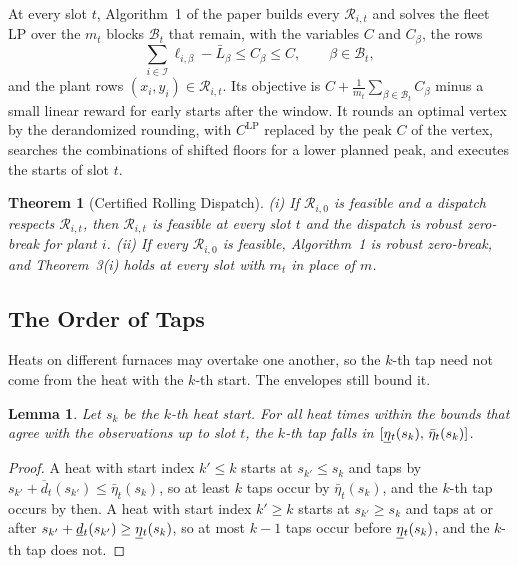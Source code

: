 \documentclass[11pt]{article}
\newtheorem{theorem}{Theorem}
\newtheorem{lemma}{Lemma}
\newcommand{\calB}{\mathcal{B}}
\newcommand{\calI}{\mathcal{I}}
\newcommand{\calR}{\mathcal{R}}
\newcommand{\CLP}{C^{\mathrm{LP}}}
\newcommand{\dmin}{\vphantom{\underline{d}}\smash[b]{\underline{d}}}
\newcommand{\dmax}{\overline{d}}
\newcommand{\etamin}{\vphantom{\underline{\eta}}\smash[b]{\underline{\eta}}}
\begin{document}
At every slot $t$, Algorithm~1 of the paper builds every $\calR_{i,t}$ and solves the fleet LP over the $m_t$ blocks
$\calB_t$ that remain, with the variables $C$ and $C_\beta$, the rows
\begin{equation}\label{eq:rollcap}
\sum_{i\in\calI}\ell_{i,\beta}-\bar L_\beta\le C_\beta\le C,\qquad\beta\in\calB_t,
\end{equation}
and the plant rows $(x_i,y_i)\in\calR_{i,t}$. Its objective is $C+\frac1{m_t}\sum_{\beta\in\calB_t}C_\beta$ minus a small linear
reward for early starts after the window. It rounds an optimal vertex by the derandomized
rounding, with $\CLP$ replaced by the peak $C$ of the vertex, searches the combinations of shifted floors for a lower
planned peak, and executes the starts of slot $t$.

\begin{theorem}[Certified Rolling Dispatch]
(i) If $\calR_{i,0}$ is feasible and a dispatch respects $\calR_{i,t}$, then $\calR_{i,t}$ is feasible at every slot
$t$ and the dispatch is robust zero-break for plant $i$. (ii) If every $\calR_{i,0}$ is feasible, Algorithm~1 is robust
zero-break, and Theorem~3(i) holds at every slot with $m_t$ in place of $m$.
\end{theorem}

\subsection{The Order of Taps}

Heats on different furnaces may overtake one another, so the $k$-th tap need not come from the heat with the $k$-th
start. The envelopes still bound it.

\begin{lemma}\label{lem:taps}
Let $s_k$ be the $k$-th heat start. For all heat times within the bounds that agree with the observations up to slot
$t$, the $k$-th tap falls in $[\etamin_t(s_k),\,\bar\eta_t(s_k)]$.
\end{lemma}

\begin{proof}
A heat with start index $k'\le k$ starts at $s_{k'}\le s_k$ and taps by $s_{k'}+\dmax_t(s_{k'})\le\bar\eta_t(s_k)$,
so at least $k$ taps occur by $\bar\eta_t(s_k)$, and the $k$-th tap occurs by then. A heat with start index $k'\ge k$
starts at $s_{k'}\ge s_k$ and taps at or after $s_{k'}+\dmin_t(s_{k'})\ge\etamin_t(s_k)$, so at most $k-1$ taps occur
before $\etamin_t(s_k)$, and the $k$-th tap does not.
\end{proof}
\end{document}
